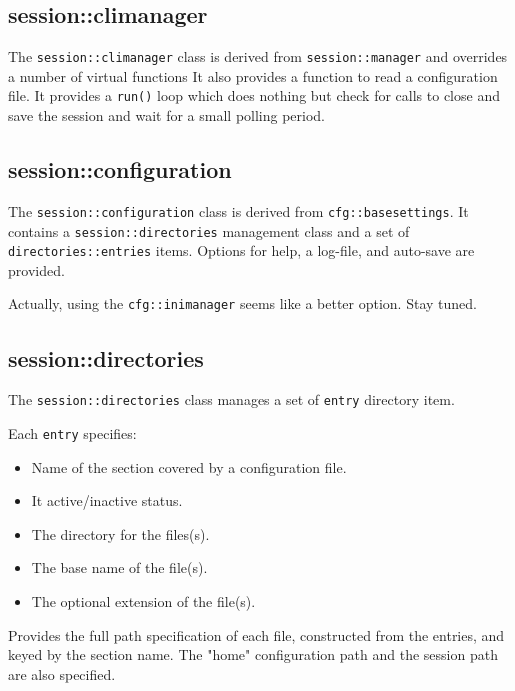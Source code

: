\subsection{session::climanager}
\label{subsec:session_namespace_climanager}

   The \texttt{session::climanager} class is derived from
   \texttt{session::manager} and overrides a number of virtual functions
   It also provides a function to read a configuration file.
   It provides a \texttt{run()} loop which does nothing
   but check for calls to close and save the session and wait for a small
   polling period.

\subsection{session::configuration}
\label{subsec:session_namespace_configuration}

   The \texttt{session::configuration} class is derived from
   \texttt{cfg::basesettings}.
   It contains a \texttt{session::directories} management class
   and a set of
   \texttt{directories::entries} items.
   Options for help, a log-file, and auto-save are provided.

   Actually, using the \texttt{cfg::inimanager} seems like a better option.
   Stay tuned.

\subsection{session::directories}
\label{subsec:session_namespace_directories}

   The \texttt{session::directories} class manages a set of
   \texttt{entry} directory item.

   Each \texttt{entry} specifies:

   \begin{itemize}
      \item Name of the section covered by a configuration file.
      \item It active/inactive status.
      \item The directory for the files(s).
      \item The base name of the file(s).
      \item The optional extension of the file(s).
   \end{itemize}

   Provides the full path specification of each file, constructed
   from the entries, and keyed by the section name.
   The "home" configuration path and the session path are also specified.

